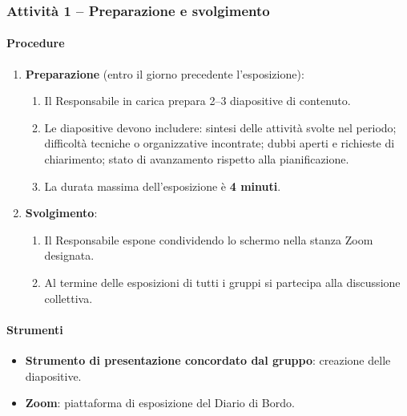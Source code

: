 \documentclass[a4paper, 11pt, oneside]{scrartcl}
\begin{document}
\subsubsection{Attività 1 – Preparazione e svolgimento}

\paragraph{Procedure}
\begin{enumerate}
    \item \textbf{Preparazione} (entro il giorno precedente l'esposizione):
          \begin{enumerate}[label=\alph*.]
              \item Il Responsabile in carica prepara 2–3 diapositive di contenuto.
              \item Le diapositive devono includere: sintesi delle attività svolte nel periodo; difficoltà tecniche o organizzative incontrate; dubbi aperti e richieste di chiarimento; stato di avanzamento rispetto alla pianificazione.
              \item La durata massima dell'esposizione è \textbf{4 minuti}.
          \end{enumerate}
    \item \textbf{Svolgimento}:
          \begin{enumerate}[label=\alph*.]
              \item Il Responsabile espone condividendo lo schermo nella stanza Zoom designata.
              \item Al termine delle esposizioni di tutti i gruppi si partecipa alla discussione collettiva.
          \end{enumerate}
\end{enumerate}

\paragraph{Strumenti}
\begin{itemize}
    \item \textbf{Strumento di presentazione concordato dal gruppo}: creazione delle diapositive.
    \item \textbf{Zoom}: piattaforma di esposizione del Diario di Bordo.
\end{itemize}

\end{document}
